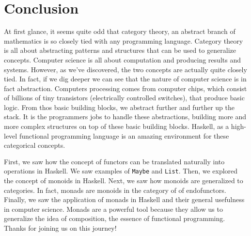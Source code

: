 \chapter{Conclusion}

At first glance, it seems quite odd that category theory, an abstract branch of mathematics is so closely tied with any programming language. Category theory is all about abstracting patterns and structures that can be used to generalize concepts. Computer science is all about computation and producing results and systems. However, as we've discovered, the two concepts are actually quite closely tied. In fact, if we dig deeper we can see that the nature of computer science is in fact abstraction. Computers processing comes from computer chips, which consist of billions of tiny transistors (electrically controlled switches), that produce basic logic. From thos basic building blocks, we abstract further and further up the stack. It is the programmers jobs to handle these abstractions, building more and more complex structures on top of these basic building blocks. Haskell, as a high-level functional programming language is an amazing environment for these categorical concepts.

First, we saw how the concept of functors can be translated naturally into operations in Haskell. We saw examples of \lstinline{Maybe} and \lstinline{List}. Then, we explored the concept of monoids in Haskell. Next, we saw how monoids are generalized to categories. In fact, monads are monoids in the category of of endofunctors. Finally, we saw the application of monads in Haskell and their general usefulness in computer science. Monads are a powerful tool because they allow us to generalize the idea of composition, the essence of functional programming. Thanks for joining us on this journey!